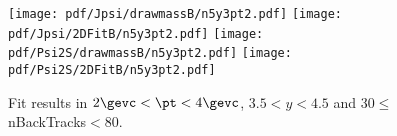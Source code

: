 \begin{figure}[H]
\begin{center}
\texttt{[image: pdf/Jpsi/drawmassB/n5y3pt2.pdf]}
\texttt{[image: pdf/Jpsi/2DFitB/n5y3pt2.pdf]}
\vspace*{-0.5cm}
\texttt{[image: pdf/Psi2S/drawmassB/n5y3pt2.pdf]}
\texttt{[image: pdf/Psi2S/2DFitB/n5y3pt2.pdf]}
\vspace*{-0.5cm}
\end{center}
\caption{Fit results in $2\gevc<\pt<4\gevc$, $3.5<y<4.5$ and 30$\leq$nBackTracks$<$80.}
\label{Fitn5y3pt2}
\end{figure}
